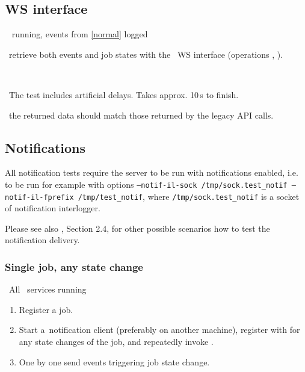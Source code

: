\subsection{WS interface}
\req\  running, events from \ref{normal} logged

\what\ retrieve both events and job states with the \LB\ WS interface
(operations , ).

\how\ 

\note\ The test includes artificial delays. Takes approx. 10\,s to finish.

\result\ the returned data should match those returned by the legacy API calls.











\subsection{Notifications}

All notification tests require the \LB server to be run with notifications enabled,
i.e. to be run for example with options 
\texttt{--notif-il-sock /tmp/sock.test\_notif --notif-il-fprefix /tmp/test\_notif}, 
where \texttt{/tmp/sock.test\_notif} is a socket of notification interlogger.

Please see also \cite{lbug}, Section 2.4, for other possible scenarios how to test the notification delivery.


\subsubsection{Single job, any state change}
\label{notif1}
\req\ All \LB\ services running

\what
\begin{enumerate}
\item Register a job.
\item Start a~notification client (preferably on another machine),
register with  for any state changes of the job,
and repeatedly invoke .
\item One by one send events triggering job state change.
\end{enumerate}

